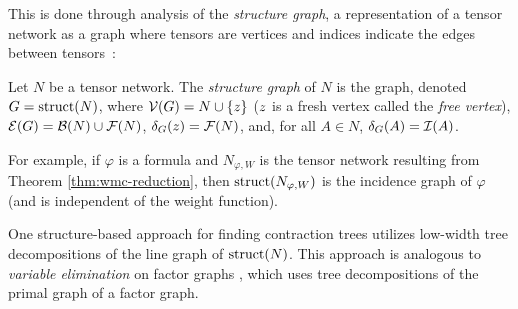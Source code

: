 This is done through analysis of the \emph{structure graph}, a representation of a tensor network as a graph where tensors are vertices and indices indicate the edges between tensors~\cite{DDV19,MS08,Ying17}:
\begin{definition}\label{def:structure}
	Let $N$ be a tensor network. The \emph{structure graph} of $N$ is the graph, denoted $G = \text{struct}(N)$, where $\mathcal{V}(G) = N \cup \{z\}$ ($z$ is a fresh vertex called the \emph{free vertex}), $\mathcal{E}(G) = \mathcal{B}(N) \cup \mathcal{F}(N)$, $\delta_{G}(z) = \mathcal{F}(N)$, and, for all $A \in N$, $\delta_{G}(A) = \mathcal{I}(A)$.
	
\end{definition}


For example, if $\varphi$ is a formula and $N_{\varphi,W}$ is the tensor network resulting from Theorem \ref{thm:wmc-reduction}, then $\text{struct}(N_{\varphi,W})$ is the incidence graph of $\varphi$ (and is independent of the weight function).

One structure-based approach for finding contraction trees \cite{DFGHSW18,MS08} utilizes low-width tree decompositions of the line graph of $\text{struct}(N)$. This approach is analogous to \emph{variable elimination} on factor graphs \cite{BDP09,KDLD05}, which uses tree decompositions of the primal graph of a factor graph.

